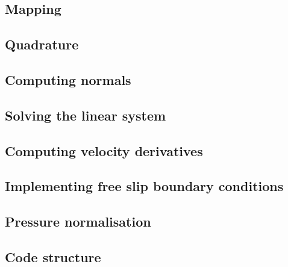 \documentclass[a4paper,12pt]{article}
\begin{document}
\subsection{Mapping}


\subsection{Quadrature}

\subsection{Computing normals}


\subsection{Solving the linear system}


\subsection{Computing velocity derivatives}


\subsection{Implementing free slip boundary conditions}


\subsection{Pressure normalisation}


\newpage
\subsection{Code structure}







\newpage
\end{document}
